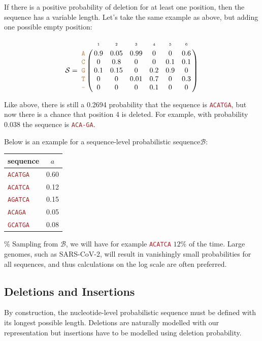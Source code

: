 \documentclass[
]{article}
\newcommand{\sq}[1]{\texttt{\textcolor{brown}{#1}}}
\newcommand{\sps}{\mathcal{B}} %
\newcommand{\nps}{\mathcal{S}} %
\newcommand{\nlps}{nucleotide-level probabilistic sequence\xspace}
\newcommand{\slps}{sequence-level probabilistic sequence\xspace}
\begin{document}
If there is a positive probability of deletion for at least one
position, then the sequence has a variable length. Let's take the same
example as above, but adding one possible empty position:

\[
\nps = 
\bordermatrix{
&\scriptscriptstyle{1} & \scriptscriptstyle{2}& \scriptscriptstyle{3}& \scriptscriptstyle{4} & \scriptscriptstyle{5} & \scriptscriptstyle{6} \cr
\sq{A} & 0.9 & 0.05   & 0.99 & 0 & 0 & 0.6\cr
\sq{C} & 0   & 0.8 & 0 & 0 & 0.1 & 0.1\cr
\sq{G} & 0.1 & 0.15 & 0 & 0.2 & 0.9 & 0\cr
\sq{T} & 0 & 0 & 0.01 & 0.7 & 0 & 0.3\cr
\sq{-} & 0 & 0 & 0 & 0.1 & 0 & 0\cr
}
\]

\noindent Like above, there is still a 0.2694 probability that the
sequence is \sq{ACATGA}, but now there is a chance that position 4 is
deleted. For example, with probability 0.038 the sequence is
\sq{ACA-GA}.

Below is an example for a \slps \(\sps\):

\begin{table}[H]
\begin{center}
\begin{tabular}{lc}
\hline
\textbf{sequence} & $a$ \\
\hline
\sq{ACATGA} & 0.60 \\
\sq{ACATCA} & 0.12 \\
\sq{AGATCA} & 0.15 \\
\sq{ACAGA}  & 0.05 \\
\sq{GCATGA} & 0.08 \\
\hline
\end{tabular}
\end{center}
\label{default}
\end{table}

\% Sampling from \(\sps\), we will have for example \sq{ACATCA} \(12\%\)
of the time. Large genomes, such as SARS-CoV-2, will result in
vanishingly small probabilities for all sequences, and thus calculations
on the log scale are often preferred.

\hypertarget{deletions-and-insertions}{%
\subsection{Deletions and Insertions}\label{deletions-and-insertions}}

By construction, the \nlps must be defined with its longest possible
length. Deletions are naturally modelled with our representation but
insertions have to be modelled using deletion probability.
\end{document}
